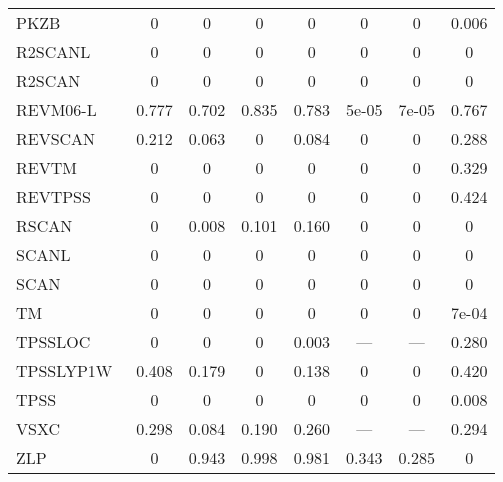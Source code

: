 \begin{table*}
\begin{tabular}{|l|c|c|c|c|c|c|c|}
PKZB~\cite{Perdew1999_2544} & 0 & 0 & 0 & 0 & 0 & 0 & 0.006 \\
R2SCANL~\cite{Mejia2020_121109,Furness2020_8208,Furness2020_9248} & 0 & 0 & 0 & 0 & 0 & 0 & 0 \\
R2SCAN~\cite{Furness2020_8208,Furness2020_9248} & 0 & 0 & 0 & 0 & 0 & 0 & 0 \\
REVM06-L~\cite{Wang2017_8487} & 0.777 & 0.702 & 0.835 & 0.783 & 5e-05 & 7e-05 & 0.767 \\
REVSCAN~\cite{Mezei2018_2469} & 0.212 & 0.063 & 0 & 0.084 & 0 & 0 & 0.288 \\
REVTM~\cite{Jana2019_6356} & 0 & 0 & 0 & 0 & 0 & 0 & 0.329 \\
REVTPSS~\cite{Perdew2009_026403,Perdew2011_179902} & 0 & 0 & 0 & 0 & 0 & 0 & 0.424 \\
RSCAN~\cite{Bartok2019_161101} & 0 & 0.008 & 0.101 & 0.160 & 0 & 0 & 0 \\
SCANL~\cite{Mejia2017_052512,Mejia2018_115161,Sun2015_036402} & 0 & 0 & 0 & 0 & 0 & 0 & 0 \\
SCAN~\cite{Sun2015_036402} & 0 & 0 & 0 & 0 & 0 & 0 & 0 \\
TM~\cite{Tao2016_073001} & 0 & 0 & 0 & 0 & 0 & 0 & 7e-04 \\
TPSSLOC~\cite{Constantin2012_035130} & 0 & 0 & 0 & 0.003 & --- & --- & 0.280 \\
TPSSLYP1W~\cite{Dahlke2005_15677} & 0.408 & 0.179 & 0 & 0.138 & 0 & 0 & 0.420 \\
TPSS~\cite{Tao2003_146401,Perdew2004_6898} & 0 & 0 & 0 & 0 & 0 & 0 & 0.008 \\
VSXC~\cite{VanVoorhis1998_400} & 0.298 & 0.084 & 0.190 & 0.260 & --- & --- & 0.294 \\
ZLP~\cite{Zhao1993_918} & 0 & 0.943 & 0.998 & 0.981 & 0.343 & 0.285 & 0 \\
\bottomrule
\end{tabular}
\end{table*}
